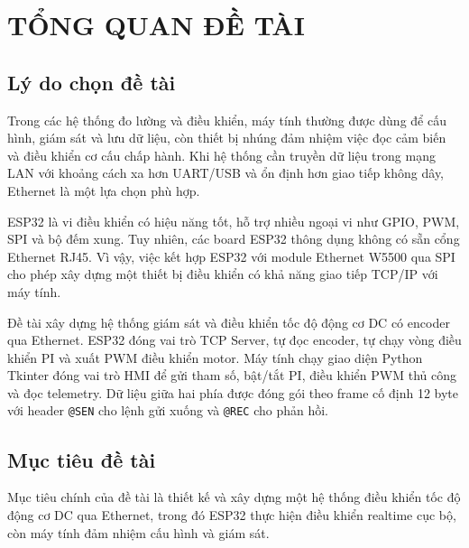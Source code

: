 \documentclass[12pt,a4paper]{report}
\begin{document}
\newpage

\listoffigures






\setcounter{page}{1}



\chapter{TỔNG QUAN ĐỀ TÀI}

\section{Lý do chọn đề tài}

Trong các hệ thống đo lường và điều khiển, máy tính thường được dùng để cấu hình, giám sát và lưu dữ liệu, còn thiết bị nhúng đảm nhiệm việc đọc cảm biến và điều khiển cơ cấu chấp hành. Khi hệ thống cần truyền dữ liệu trong mạng LAN với khoảng cách xa hơn UART/USB và ổn định hơn giao tiếp không dây, Ethernet là một lựa chọn phù hợp.

ESP32 là vi điều khiển có hiệu năng tốt, hỗ trợ nhiều ngoại vi như GPIO, PWM, SPI và bộ đếm xung. Tuy nhiên, các board ESP32 thông dụng không có sẵn cổng Ethernet RJ45. Vì vậy, việc kết hợp ESP32 với module Ethernet W5500 qua SPI cho phép xây dựng một thiết bị điều khiển có khả năng giao tiếp TCP/IP với máy tính.

Đề tài xây dựng hệ thống giám sát và điều khiển tốc độ động cơ DC có encoder qua Ethernet. ESP32 đóng vai trò TCP Server, tự đọc encoder, tự chạy vòng điều khiển PI và xuất PWM điều khiển motor. Máy tính chạy giao diện Python Tkinter đóng vai trò HMI để gửi tham số, bật/tắt PI, điều khiển PWM thủ công và đọc telemetry. Dữ liệu giữa hai phía được đóng gói theo frame cố định 12 byte với header \texttt{@SEN} cho lệnh gửi xuống và \texttt{@REC} cho phản hồi.

\section{Mục tiêu đề tài}

Mục tiêu chính của đề tài là thiết kế và xây dựng một hệ thống điều khiển tốc độ động cơ DC qua Ethernet, trong đó ESP32 thực hiện điều khiển realtime cục bộ, còn máy tính đảm nhiệm cấu hình và giám sát.
\end{document}
